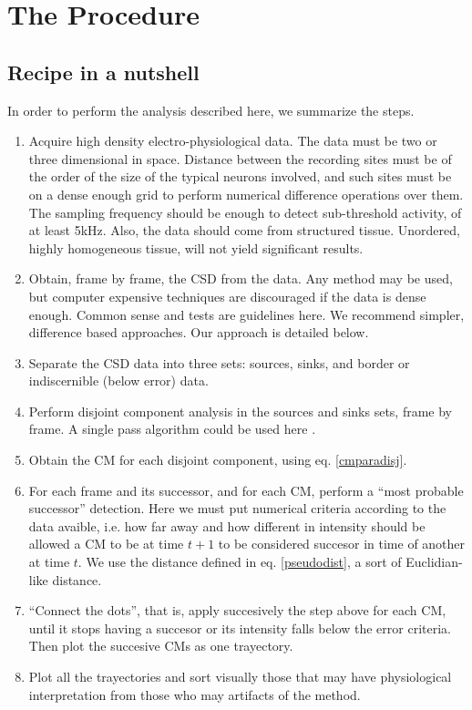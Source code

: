 \documentclass{article}
\begin{document}
 
 \section{The Procedure}
\subsection{Recipe in a nutshell}
 
 In order to perform the analysis described here, we summarize the steps.
 \begin{enumerate}
 \item Acquire high density electro-physiological data. The data must be two or three dimensional in space. Distance between the recording sites must be of the order of the size of the typical neurons involved, and such sites must be on a dense enough grid to perform numerical difference operations over them. The sampling frequency should be enough to detect sub-threshold activity, of at least 5kHz. Also, the data should come from structured tissue. Unordered, highly homogeneous tissue, will not yield significant results. 
\item Obtain, frame by frame, the CSD from the data. Any method may be used, but computer expensive techniques are discouraged if the data is dense enough. Common sense and tests are guidelines here. We recommend simpler, difference based approaches. Our approach is detailed below.
\item Separate the CSD data into three sets: sources, sinks, and border or indiscernible (below error) data.
\item Perform disjoint component analysis in the sources and sinks sets, frame by frame.
  A single pass algorithm could be used here \cite{Vincent91, Abubaker07}.
\item  Obtain the CM for each disjoint component, using eq. \ref{cmparadisj}.
\item For each frame and its successor, and for each CM, perform a ``most probable successor'' detection. Here we must put numerical criteria according to the data avaible, i.e. how far away and how different in intensity should be allowed a CM to be at time $t+1$ to be considered succesor in time of another at time $t$. We use the distance defined in eq. \ref{pseudodist}, a sort of Euclidian-like distance. 
\item ``Connect the dots'', that is, apply succesively the step above for each CM, until it stops having a succesor or its intensity falls below the error criteria. Then plot the succesive CMs as one trayectory.
  \item Plot all the trayectories and sort visually those that may have physiological interpretation from those who may artifacts of the method. 
\end{enumerate}
\end{document}
